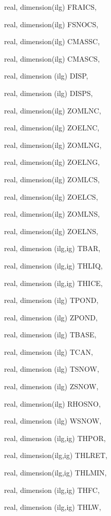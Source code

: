 {\begin{DoxyParamCaption}
\item[{real, dimension(ilg)}]{F\+R\+A\+I\+C\+S, }
\item[{real, dimension(ilg)}]{F\+S\+N\+O\+C\+S, }
\item[{real, dimension(ilg)}]{C\+M\+A\+S\+S\+C, }
\item[{real, dimension(ilg)}]{C\+M\+A\+S\+C\+S, }
\item[{real, dimension  (ilg)}]{D\+I\+S\+P, }
\item[{real, dimension (ilg)}]{D\+I\+S\+P\+S, }
\item[{real, dimension(ilg)}]{Z\+O\+M\+L\+N\+C, }
\item[{real, dimension(ilg)}]{Z\+O\+E\+L\+N\+C, }
\item[{real, dimension(ilg)}]{Z\+O\+M\+L\+N\+G, }
\item[{real, dimension(ilg)}]{Z\+O\+E\+L\+N\+G, }
\item[{real, dimension(ilg)}]{Z\+O\+M\+L\+C\+S, }
\item[{real, dimension(ilg)}]{Z\+O\+E\+L\+C\+S, }
\item[{real, dimension(ilg)}]{Z\+O\+M\+L\+N\+S, }
\item[{real, dimension(ilg)}]{Z\+O\+E\+L\+N\+S, }
\item[{real, dimension  (ilg,ig)}]{T\+B\+A\+R, }
\item[{real, dimension (ilg,ig)}]{T\+H\+L\+I\+Q, }
\item[{real, dimension (ilg,ig)}]{T\+H\+I\+C\+E, }
\item[{real, dimension (ilg)}]{T\+P\+O\+N\+D, }
\item[{real, dimension (ilg)}]{Z\+P\+O\+N\+D, }
\item[{real, dimension (ilg)}]{T\+B\+A\+S\+E, }
\item[{real, dimension  (ilg)}]{T\+C\+A\+N, }
\item[{real, dimension (ilg)}]{T\+S\+N\+O\+W, }
\item[{real, dimension (ilg)}]{Z\+S\+N\+O\+W, }
\item[{real, dimension(ilg)}]{R\+H\+O\+S\+N\+O, }
\item[{real, dimension (ilg)}]{W\+S\+N\+O\+W, }
\item[{real, dimension (ilg,ig)}]{T\+H\+P\+O\+R, }
\item[{real, dimension(ilg,ig)}]{T\+H\+L\+R\+E\+T, }
\item[{real, dimension(ilg,ig)}]{T\+H\+L\+M\+I\+N, }
\item[{real, dimension  (ilg,ig)}]{T\+H\+F\+C, }
\item[{real, dimension  (ilg,ig)}]{T\+H\+L\+W, }

\end{DoxyParamCaption}}
